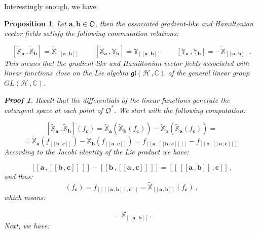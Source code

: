 \documentclass[11pt]{article}
\newcommand{\be}{\begin{equation}}
\newcommand{\ee}{\end{equation}}
\newcommand{\obsp}{\mathfrak{O}}
\newtheorem{prop}{Proposition}
\newtheorem*{pf}{Proof}
\begin{document}
Interestingly enough, we have:

\begin{prop}
Let $\mathbf{a},\mathbf{b}\in\obsp$, then the associated gradient-like and Hamiltonian vector fields satisfy the following commutation relations:

\be\label{eqn: commutation relations of the general linear group on ustarh by means of hamiltonian and gradient-like vector fields}
[\widetilde{\mathbb{X}}_{\mathbf{a}}\,,\widetilde{\mathbb{X}}_{\mathbf{b}}]=\widetilde{\mathbb{X}}_{[[\mathbf{a}\,,\mathbf{b}]]}\;\;\;\;\;\;\;\;[\widetilde{\mathbb{X}}_{\mathbf{a}}\,,\mathbb{Y}_{\mathbf{b}}]=\mathbb{Y}_{[[\mathbf{a}\,,\mathbf{b}]]}\;\;\;\;\;\;\;\;[\mathbb{Y}_{\mathbf{a}}\,,\mathbb{Y}_{\mathbf{b}}]=-\widetilde{\mathbb{X}}_{[[\mathbf{a}\,,\mathbf{b}]]}\,.
\ee
This means that the gradient-like and Hamiltonian vector fields associated with linear functions close on the Lie algebra $\mathfrak{gl}(\mathcal{H}\,,\mathbb{C})$ of the general linear group $GL(\mathcal{H}\,,\mathbb{C})$.


\begin{pf}
Recall that the differentials of the linear functions generate the cotangent space at each point of $\obsp^{*}$.
We start with the following computation:

$$
[\widetilde{\mathbb{X}}_{\mathbf{a}}\,,\widetilde{\mathbb{X}}_{\mathbf{b}}](f_{\mathbf{c}})=\widetilde{\mathbb{X}}_{\mathbf{a}}(\widetilde{\mathbb{X}}_{\mathbf{b}}(f_{\mathbf{c}})) - \widetilde{\mathbb{X}}_{\mathbf{b}}(\widetilde{\mathbb{X}}_{\mathbf{a}}(f_{\mathbf{c}}))= 
$$
$$
=\widetilde{\mathbb{X}}_{\mathbf{a}}(f_{[[\mathbf{b}\,,\mathbf{c}]]}) - \widetilde{\mathbb{X}}_{\mathbf{b}}(f_{[[\mathbf{a}\,,\mathbf{c}]]})=f_{[[\mathbf{a}\,,[[\mathbf{b}\,,\mathbf{c}]]]]} - f_{[[\mathbf{b}\,,[[\mathbf{a}\,,\mathbf{c}]]]]}
$$
According to the Jacobi identity of the Lie product we have:

\be\label{eqn: double lie bracket}
[[\mathbf{a}\,,[[\mathbf{b}\,,\mathbf{c}]]\,]] - [[\mathbf{b}\,,[[\mathbf{a}\,,\mathbf{c}]]\,]]=[[\,[[\mathbf{a}\,,\mathbf{b}]]\,,\mathbf{c}]]\,,
\ee
and thus:
\be
[\widetilde{\mathbb{X}}_{\mathbf{a}}\,,\widetilde{\mathbb{X}}_{\mathbf{b}}](f_{\mathbf{c}})=f_{[[[[\mathbf{a}\,,\mathbf{b}]]\,,\mathbf{c}]]}=\widetilde{\mathbb{X}}_{[[\mathbf{a}\,,\mathbf{b}]]}(f_{\mathbf{c}})\,,
\ee
which means:

\be
[\widetilde{\mathbb{X}}_{\mathbf{a}}\,,\widetilde{\mathbb{X}}_{\mathbf{b}}]=\widetilde{\mathbb{X}}_{[[\mathbf{a}\,,\mathbf{b}]]}\,.
\ee
Next, we have:


\end{pf}
\end{prop}
\end{document}
